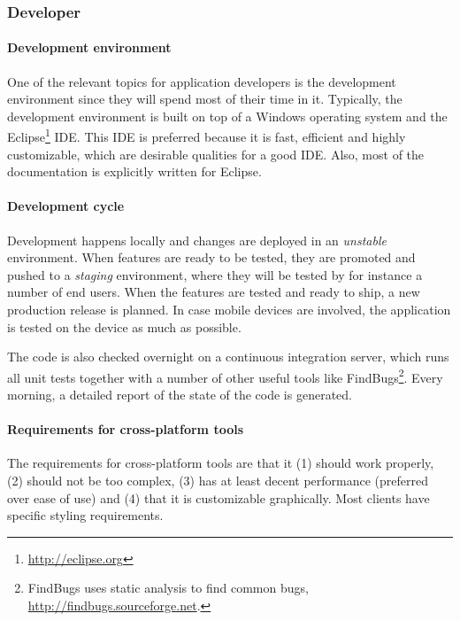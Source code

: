 \subsubsection{Developer}

\paragraph{Development environment}

One of the relevant topics for application developers is the development environment since they will spend most of their time in it. Typically, the development environment is built on top of a Windows operating system and the Eclipse\footnote{\url{http://eclipse.org}} IDE. This IDE is preferred because it is fast, efficient and highly customizable, which are desirable qualities for a good IDE. Also, most of the documentation is explicitly written for Eclipse. 

\paragraph{Development cycle}

Development happens locally and changes are deployed in an \emph{unstable}  environment. When features are ready to be tested, they are promoted and pushed to a \emph{staging} environment, where they will be tested by for instance a number of end users. When the features are tested and ready to ship, a new production release is planned. In case mobile devices are involved, the application is tested on the device as much as possible.

The code is also checked overnight on a continuous integration server, which runs all unit tests together with a number of other useful tools like FindBugs\footnote{FindBugs uses static analysis to find common bugs, \url{http://findbugs.sourceforge.net}.}. Every morning, a detailed report of the state of the code is generated.

\paragraph{Requirements for cross-platform tools}

The requirements for cross-platform tools are that it (1) should work properly, (2) should not be too complex, (3) has at least decent performance (preferred over ease of use) and (4) that it is customizable graphically. Most clients have specific styling requirements.

